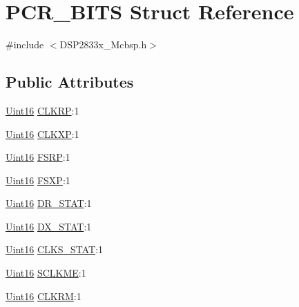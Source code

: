 \hypertarget{struct_p_c_r___b_i_t_s}{}\section{P\+C\+R\+\_\+\+B\+I\+T\+S Struct Reference}
\label{struct_p_c_r___b_i_t_s}


{\ttfamily \#include $<$D\+S\+P2833x\+\_\+\+Mcbsp.\+h$>$}

\subsection*{Public Attributes}
\begin{DoxyCompactItemize}
\item 
\hyperlink{_d_s_p2833x___device_8h_a59a9f6be4562c327cbfb4f7e8e18f08b}{Uint16} \hyperlink{struct_p_c_r___b_i_t_s_aa546e5c63a34224e556a1d936a990370}{C\+L\+K\+R\+P}\+:1
\item 
\hyperlink{_d_s_p2833x___device_8h_a59a9f6be4562c327cbfb4f7e8e18f08b}{Uint16} \hyperlink{struct_p_c_r___b_i_t_s_a93d27a228eb52f9c08c996514185c3fb}{C\+L\+K\+X\+P}\+:1
\item 
\hyperlink{_d_s_p2833x___device_8h_a59a9f6be4562c327cbfb4f7e8e18f08b}{Uint16} \hyperlink{struct_p_c_r___b_i_t_s_ac747d0c33878cadfa6b636fdc231ff80}{F\+S\+R\+P}\+:1
\item 
\hyperlink{_d_s_p2833x___device_8h_a59a9f6be4562c327cbfb4f7e8e18f08b}{Uint16} \hyperlink{struct_p_c_r___b_i_t_s_ab14e3f2ec8f7df06e1275db3294294c9}{F\+S\+X\+P}\+:1
\item 
\hyperlink{_d_s_p2833x___device_8h_a59a9f6be4562c327cbfb4f7e8e18f08b}{Uint16} \hyperlink{struct_p_c_r___b_i_t_s_ab55c4e9cafa2f163f98e86e0e33aa0a1}{D\+R\+\_\+\+S\+T\+A\+T}\+:1
\item 
\hyperlink{_d_s_p2833x___device_8h_a59a9f6be4562c327cbfb4f7e8e18f08b}{Uint16} \hyperlink{struct_p_c_r___b_i_t_s_ad8333c7aa4e95d77435b6ae73c71e2ef}{D\+X\+\_\+\+S\+T\+A\+T}\+:1
\item 
\hyperlink{_d_s_p2833x___device_8h_a59a9f6be4562c327cbfb4f7e8e18f08b}{Uint16} \hyperlink{struct_p_c_r___b_i_t_s_ab434cea780b8b00ade78b94099ca7765}{C\+L\+K\+S\+\_\+\+S\+T\+A\+T}\+:1
\item 
\hyperlink{_d_s_p2833x___device_8h_a59a9f6be4562c327cbfb4f7e8e18f08b}{Uint16} \hyperlink{struct_p_c_r___b_i_t_s_a5928a328051c88b72678df28854b2422}{S\+C\+L\+K\+M\+E}\+:1
\item 
\hyperlink{_d_s_p2833x___device_8h_a59a9f6be4562c327cbfb4f7e8e18f08b}{Uint16} \hyperlink{struct_p_c_r___b_i_t_s_a8758f73994f0b671f42e538d77c9dd54}{C\+L\+K\+R\+M}\+:1

\end{DoxyCompactItemize}
